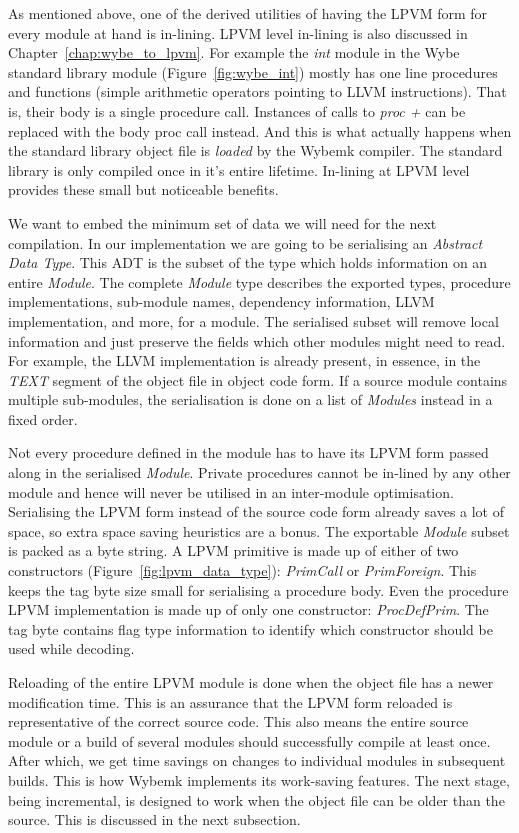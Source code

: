 As mentioned above, one of the derived utilities of having the LPVM form for
every module at hand is in-lining. LPVM level in-lining is also discussed in
Chapter~\ref{chap:wybe_to_lpvm}. For example the \textit{int} module in the
Wybe standard library module (Figure~\ref{fig:wybe_int}) mostly has one line
procedures and functions (simple arithmetic operators pointing to LLVM
instructions). That is, their body is a single procedure call. Instances of
calls to \textit{proc +} can be replaced with the body proc call instead. And
this is what actually happens when the standard library object file is
\textit{loaded} by the Wybemk compiler. The standard library is only compiled
once in it's entire lifetime. In-lining at LPVM level provides these small but
noticeable benefits.

We want to embed the minimum set of data we will need for the next
compilation. In our implementation we are going to be serialising an
\textit{Abstract Data Type}. This ADT is the subset of the type which holds
information on an entire \textit{Module}. The complete \textit{Module} type
describes the exported types, procedure implementations, sub-module names,
dependency information, LLVM implementation, and more, for a module. The
serialised subset will remove local information and just preserve the fields
which other modules might need to read. For example, the LLVM implementation is
already present, in essence, in the \textit{TEXT} segment of the object file in
object code form. If a source module contains multiple sub-modules, the
serialisation is done on a list of \textit{Modules} instead in a fixed order.

Not every procedure defined in the module has to have its LPVM form passed
along in the serialised \textit{Module}. Private procedures cannot be in-lined
by any other module and hence will never be utilised in an inter-module
optimisation. Serialising the LPVM form instead of the source code form already
saves a lot of space, so extra space saving heuristics are a bonus. The
exportable \textit{Module} subset is packed as a byte string. A LPVM primitive
is made up of either of two constructors (Figure~\ref{fig:lpvm_data_type}):
\textit{PrimCall} or \textit{PrimForeign}. This keeps the tag byte size small
for serialising a procedure body. Even the procedure LPVM implementation is
made up of only one constructor: \textit{ProcDefPrim}. The tag byte contains
flag type information to identify which constructor should be used while
decoding.

Reloading of the entire LPVM module is done when the object file has a newer
modification time. This is an assurance that the LPVM form reloaded is
representative of the correct source code. This also means the entire source
module or a build of several modules should successfully compile at least
once. After which, we get time savings on changes to individual modules in
subsequent builds. This is how Wybemk implements its work-saving features. The
next stage, being incremental, is designed to work when the object file can be
older than the source. This is discussed in the next subsection.



